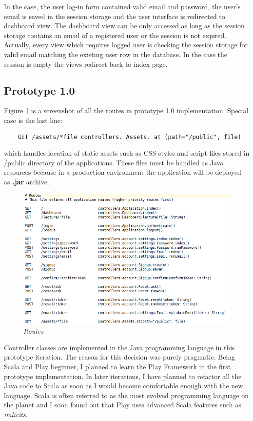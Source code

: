\documentclass[12pt,twoside,a4paper]{report}
\begin{document}
In the case, the user log-in form contained valid email and password, the user's email is saved in the session storage and the user interface is redirected to dashboard view. The dashboard view can be only accessed as long as the session storage contains an email of a registered user or the session is not expired. Actually, every view which requires logged user is checking the session storage for valid email matching the existing user row in the database. In the case the session is empty the views redirect back to index page.

\subsection{Prototype 1.0}\label{4.5.1}

Figure \ref{f4.5.1.1} is a screenshot of all the routes in prototype 1.0 implementation. Special case is the last line:
\begin{lstlisting} 
	GET /assets/*file controllers. Assets. at (path="/public", file)
\end{lstlisting} 
which handles location of static assets such as CSS styles and script files stored in /public directory of the applications. These files must be handled as Java resources because in a production environment the application will be deployed as \textbf{.jar} archive.
\begin{figure}[!ht]
	\centering
		\includegraphics[width=1\textwidth, totalheight=9cm]
		{routes}
	\caption{\textit{Routes}}
	\label{f4.5.1.1}
\end{figure}

Controller classes are implemented in the Java programming language in this prototype iteration. The reason for this decision was purely pragmatic. Being Scala and Play beginner, I planned to learn the Play Framework in the first prototype implementation. In later iterations, I have planned to refactor all the Java code to Scala as soon as I would become comfortable enough with the new language. Scala is often referred to as the most evolved programming language on the planet and I soon found out that Play uses advanced Scala features such as \emph{imlicits}.
\end{document}
